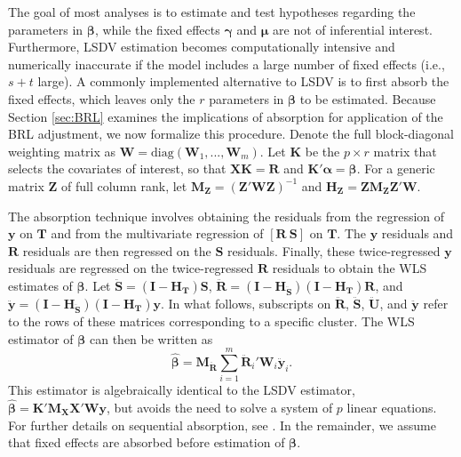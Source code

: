 \documentclass[12pt]{article}
\begin{document}
The goal of most analyses is to estimate and test hypotheses regarding
the parameters in \(\boldsymbol\beta\), while the fixed effects
\(\boldsymbol\gamma\) and \(\boldsymbol\mu\) are not of inferential
interest. Furthermore, LSDV estimation becomes computationally intensive
and numerically inaccurate if the model includes a large number of fixed
effects (i.e., \(s + t\) large). A commonly implemented alternative to
LSDV is to first absorb the fixed effects, which leaves only the \(r\)
parameters in \(\boldsymbol\beta\) to be estimated. Because Section
\ref{sec:BRL} examines the implications of absorption for application of
the BRL adjustment, we now formalize this procedure. Denote the full
block-diagonal weighting matrix as
\(\mathbf{W} = \text{diag}\left(\mathbf{W}_1,...,\mathbf{W}_m\right)\).
Let \(\mathbf{K}\) be the \(p \times r\) matrix that selects the
covariates of interest, so that \(\mathbf{X} \mathbf{K} = \mathbf{R}\)
and \(\mathbf{K}'\boldsymbol\alpha = \boldsymbol\beta\). For a generic
matrix \(\mathbf{Z}\) of full column rank, let
\(\mathbf{M_Z} = \left(\mathbf{Z}'\mathbf{W}\mathbf{Z}\right)^{-1}\) and
\(\mathbf{H_Z} = \mathbf{Z}\mathbf{M_Z}\mathbf{Z}'\mathbf{W}\).

The absorption technique involves obtaining the residuals from the
regression of \(\mathbf{y}\) on \(\mathbf{T}\) and from the multivariate
regression of \([\mathbf{R} \ \mathbf{S}]\) on \(\mathbf{T}\). The
\(\mathbf{y}\) residuals and \(\mathbf{R}\) residuals are then regressed
on the \(\mathbf{S}\) residuals. Finally, these twice-regressed
\(\mathbf{y}\) residuals are regressed on the twice-regressed
\(\mathbf{R}\) residuals to obtain the WLS estimates of
\(\boldsymbol\beta\). Let
\(\mathbf{\ddot{S}} = \left(\mathbf{I} - \mathbf{H_T}\right)\mathbf{S}\),
\(\mathbf{\ddot{R}} = \left(\mathbf{I} - \mathbf{H_{\ddot{S}}}\right)\left(\mathbf{I} - \mathbf{H_T}\right)\mathbf{R}\),
and
\(\mathbf{\ddot{y}} = \left(\mathbf{I} - \mathbf{H_{\ddot{S}}}\right)\left(\mathbf{I} - \mathbf{H_T}\right)\mathbf{y}\).
In what follows, subscripts on \(\mathbf{\ddot{R}}\),
\(\mathbf{\ddot{S}}\), \(\mathbf{\ddot{U}}\), and \(\mathbf{\ddot{y}}\)
refer to the rows of these matrices corresponding to a specific cluster.
The WLS estimator of \(\boldsymbol\beta\) can then be written as
\begin{equation}
\label{eq:WLS}
\boldsymbol{\hat\beta} = \mathbf{M_{\ddot{R}}} \sum_{i=1}^m \mathbf{\ddot{R}}_i' \mathbf{W}_i \mathbf{\ddot{y}}_i. 
\end{equation} This estimator is algebraically identical to the LSDV
estimator,
\(\boldsymbol{\hat\beta} = \mathbf{K}'\mathbf{M_X} \mathbf{X}' \mathbf{W} \mathbf{y}\),
but avoids the need to solve a system of \(p\) linear equations. For
further details on sequential absorption, see
\citet{Davis2002estimating}. In the remainder, we assume that fixed
effects are absorbed before estimation of \(\boldsymbol\beta\).
\end{document}
